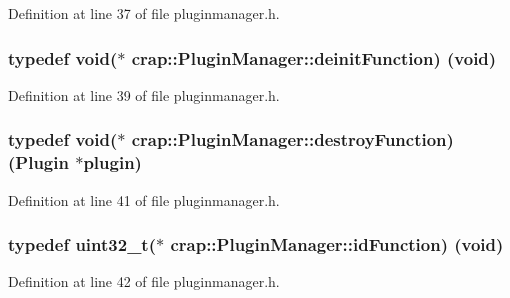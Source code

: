 Definition at line 37 of file pluginmanager.\+h.

\hypertarget{classcrap_1_1_plugin_manager_a9210bea4920fc2d62d5312e89e3086eb}{}
\subsubsection[{deinit\+Function}]{\setlength{\rightskip}{0pt plus 5cm}typedef void($\ast$ crap\+::\+Plugin\+Manager\+::deinit\+Function) (void)}\label{classcrap_1_1_plugin_manager_a9210bea4920fc2d62d5312e89e3086eb}


Definition at line 39 of file pluginmanager.\+h.

\hypertarget{classcrap_1_1_plugin_manager_a7f4b2c208e89c47c06afecacbace55f3}{}
\subsubsection[{destroy\+Function}]{\setlength{\rightskip}{0pt plus 5cm}typedef void($\ast$ crap\+::\+Plugin\+Manager\+::destroy\+Function) ({\bf Plugin} $\ast$plugin)}\label{classcrap_1_1_plugin_manager_a7f4b2c208e89c47c06afecacbace55f3}


Definition at line 41 of file pluginmanager.\+h.

\hypertarget{classcrap_1_1_plugin_manager_aae5b5d7d6f79bdfc59273630a1c5a7d9}{}
\subsubsection[{id\+Function}]{\setlength{\rightskip}{0pt plus 5cm}typedef uint32\+\_\+t($\ast$ crap\+::\+Plugin\+Manager\+::id\+Function) (void)}\label{classcrap_1_1_plugin_manager_aae5b5d7d6f79bdfc59273630a1c5a7d9}


Definition at line 42 of file pluginmanager.\+h.

\hypertarget{classcrap_1_1_plugin_manager_abfa7013bbf59b2f12368d2a13f7595b8}{}
